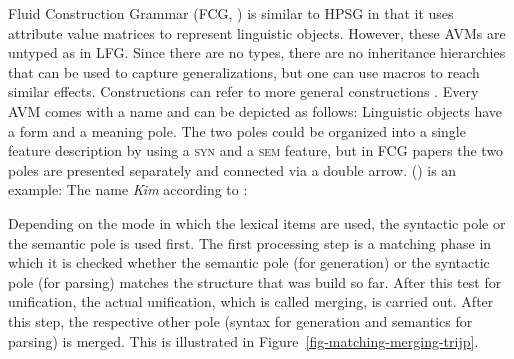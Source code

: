 Fluid Construction Grammar (FCG, \citealp{SteelsFluid-ed-not-crossreferenced}) is similar to HPSG in that it uses
attribute value matrices to represent linguistic objects. However, these AVMs are untyped as in
LFG. Since there are no types, there are no inheritance hierarchies that can be used to capture generalizations, but one can use macros to reach
similar effects. Constructions can refer to more general constructions \citep[]{vanTrijp2013a}. Every AVM
comes with a name and can be depicted as follows:
\ea
{}
\z
Linguistic objects have a form and a meaning pole. The two poles could be organized into a single feature
description by using a \textsc{syn} and a \textsc{sem} feature, but in FCG papers the two poles are
presented separately and connected via a double arrow. () is an example:
\ea
The name \emph{Kim} according to \citet[]{vanTrijp2013a}:\\
\z
\addlines
Depending on the mode in which the lexical items are used, the syntactic pole or the semantic pole
is used first. The first processing step is a matching phase in which it is checked whether the
semantic pole (for generation) or the syntactic pole (for parsing) matches the structure that was
build so far. After this test for unification, the actual unification, which is called merging, is
carried out. After this step, the respective other pole (syntax for generation and semantics for
parsing) is merged. This is illustrated in Figure~\ref{fig-matching-merging-trijp}.

